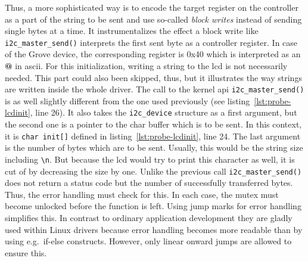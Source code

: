 Thus, a more sophisticated way is to encode the target register on the controller as a part of the string to be sent and use so-called \textit{block writes} instead of sending single bytes at a time.
It instrumentalizes the effect a block write like \texttt{i2c_master_send()} interprets the first sent byte as a controller register.
In case of the Grove device, the corresponding register is 0x40 which is interpreted as an \textbf{@} in \ac{ascii}.
For this initialization, writing a string to the \ac{lcd} is not necessarily needed.
This part could also been skipped, thus, but it illustrates the way strings are written inside the whole driver.
The call to the kernel \ac{api} \texttt{i2c_master_send()} is as well slightly different from the one used previously (see listing~\ref{lst:probe-lcdinit}, line 26).
It also takes the \texttt{i2c\_device} structure as a first argument, but the second one is a pointer to the char buffer which is to be sent.
In this context, it is \texttt{char init[]} defined in listing~\ref{lst:probe-lcdinit}, line 24.
The last argument is the number of bytes which are to be sent. 
Usually, this would be the string size including \texttt{\textbackslash n}.
But because the \ac{lcd} would try to print this character as well, it is cut of by decreasing the size by one.
Unlike the previous call \texttt{i2c_master_send()} does not return a status code but the number of successfully transferred bytes.
Thus, the error handling must check for this.
In each case, the mutex must become unlocked before the function is left.
Using jump marks for error handling simplifies this.
In contrast to ordinary application development they are gladly used within Linux drivers because error handling becomes more readable than by using e.g.\ if-else constructs.
However, only linear onward jumps are allowed to ensure this.

